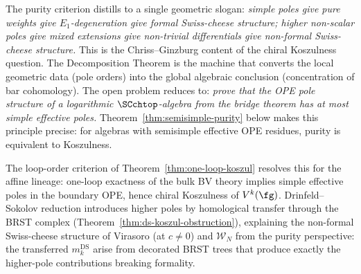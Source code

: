 \begin{remark}
\label{rem:simple-pole-principle}
The purity criterion distills to a single geometric slogan:
\emph{simple poles give pure weights give $E_1$-degeneration give
formal Swiss-cheese structure; higher non-scalar poles give mixed
extensions give non-trivial differentials give non-formal
Swiss-cheese structure.}
This is the Chriss--Ginzburg content of the chiral Koszulness
question. The Decomposition Theorem is the machine that converts
the local geometric data (pole orders) into the global algebraic
conclusion (concentration of bar cohomology). The open problem
reduces to: \emph{prove that the OPE pole structure of a logarithmic
$\SCchtop$-algebra from the bridge theorem has at most simple
effective poles.} Theorem~\ref{thm:semisimple-purity} below
makes this principle precise: for algebras with semisimple effective
OPE residues, purity is equivalent to Koszulness.

The loop-order criterion of
Theorem~\ref{thm:one-loop-koszul} resolves this for the
affine lineage: one-loop exactness of the bulk BV theory implies
simple effective poles in the boundary OPE, hence chiral Koszulness
of $V^k(\fg)$.
Drinfeld--Sokolov reduction introduces higher poles by homological
transfer through the BRST complex
(Theorem~\ref{thm:ds-koszul-obstruction}), explaining the
non-formal Swiss-cheese structure of Virasoro (at $c \neq 0$) and
$\mathcal{W}_N$ from the purity perspective: the transferred
$m_k^{\mathrm{DS}}$ arise from decorated BRST trees that produce
exactly the higher-pole contributions breaking formality.
\end{remark}

